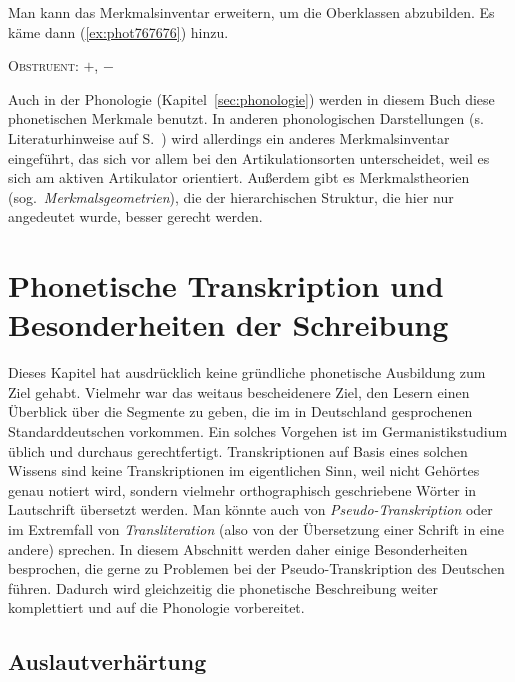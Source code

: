 Man kann das Merkmalsinventar erweitern, um die Oberklassen abzubilden.
Es käme dann (\ref{ex:phot767676}) hinzu.

\begin{exe}
		\begin{xlist}
			\ex \textsc{Obstruent}: $+$, $-$
		\end{xlist}
\end{exe}

Auch in der Phonologie (Kapitel~\ref{sec:phonologie}) werden in diesem Buch diese phonetischen Merkmale benutzt.
In anderen phonologischen Darstellungen (s. Literaturhinweise auf S.~\pageref{abs:pholliteratur}) wird allerdings ein anderes Merkmalsinventar eingeführt, das sich vor allem bei den Artikulationsorten unterscheidet, weil es sich am aktiven Artikulator orientiert.
Außerdem gibt es Merkmalstheorien (sog.\ \textit{Merkmalsgeometrien}), die der hierarchischen Struktur, die hier nur angedeutet wurde, besser gerecht werden.

\section{Phonetische Transkription und Besonderheiten der Schreibung}

\label{sec:phonetischebesonderheiten}

Dieses Kapitel hat ausdrücklich keine gründliche phonetische Ausbildung zum Ziel gehabt.
Vielmehr war das weitaus bescheidenere Ziel, den Lesern einen Überblick über die Segmente zu geben, die im in Deutschland gesprochenen Standarddeutschen vorkommen.
Ein solches Vorgehen ist im Germanistikstudium üblich und durchaus gerechtfertigt. 
Transkriptionen auf Basis eines solchen Wissens sind keine Transkriptionen im eigentlichen Sinn, weil nicht Gehörtes genau notiert wird, sondern vielmehr orthographisch geschriebene Wörter in Lautschrift übersetzt werden.
Man könnte auch von \textit{Pseudo-Transkription} oder im Extremfall von \textit{Transliteration} (also von der Übersetzung einer Schrift in eine andere) sprechen.
In diesem Abschnitt werden daher einige Besonderheiten besprochen, die gerne zu Problemen bei der Pseudo-Transkription des Deutschen führen.
Dadurch wird gleichzeitig die phonetische Beschreibung weiter komplettiert und auf die Phonologie vorbereitet.

\subsection{Auslautverhärtung}

